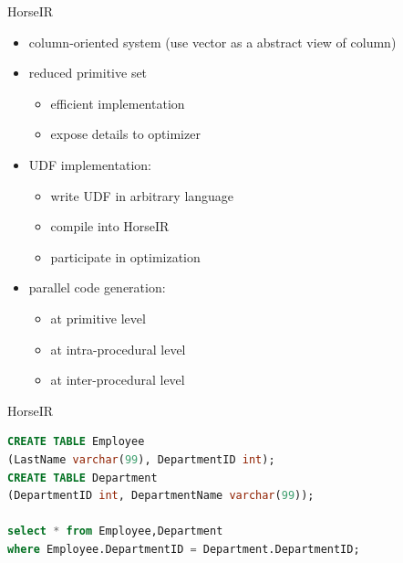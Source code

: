 \documentclass{beamer}
\begin{document}
\begin{frame}{HorseIR}
\begin{itemize}
    \item column-oriented system (use vector as a abstract view of column)
    \item reduced primitive set
          \begin{itemize}
          \item efficient implementation
          \item expose details to optimizer
          \end{itemize}
    \item UDF implementation:
          \begin{itemize}
          \item write UDF in arbitrary language
          \item compile into HorseIR
          \item participate in optimization
          \end{itemize}
    \item parallel code generation:
          \begin{itemize}
          \item at primitive level
          \item at intra-procedural level
          \item at inter-procedural level
          \end{itemize}
\end{itemize}
\end{frame}

\begin{frame}[fragile]{HorseIR}
\begin{lstlisting}[language=SQL, basicstyle=\small]
CREATE TABLE Employee 
(LastName varchar(99), DepartmentID int);
CREATE TABLE Department 
(DepartmentID int, DepartmentName varchar(99));

select * from Employee,Department
where Employee.DepartmentID = Department.DepartmentID;
\end{lstlisting}
\end{frame}
\end{document}
